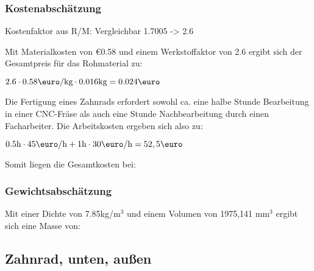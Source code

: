 \documentclass[10pt, a4paper]{article}
\begin{document}
\subsubsection{Kostenabschätzung}
\begin{center}
Kostenfaktor aus R/M: Vergleichbar 1.7005 -> 2.6 \\
\end{center}
Mit Materialkosten von \euro0.58 und einem Werkstoffaktor von 2.6 ergibt sich der Gesamtpreis für das Rohmaterial zu: 
\begin{center}
    $2.6 \cdot 0.58\text{\euro/kg} \cdot 0.016\text{kg} = 0.024\text{\euro}$
\end{center}
Die Fertigung eines Zahnrads erfordert sowohl ca. eine halbe Stunde Bearbeitung in einer CNC-Fräse als auch eine Stunde Nachbearbeitung durch einen Facharbeiter. Die Arbeitskosten ergeben sich also zu:
\begin{center}
  $0.5\text{h} \cdot 45\text{\euro/h} + 1\text{h} \cdot 30\text{\euro/h} = 52,5\text{\euro}$
\end{center}
Somit liegen die Gesamtkosten bei:
\begin{flushright}
\end{flushright}
\subsubsection{Gewichtsabschätzung}
Mit einer Dichte von 7.85kg/m$^3$ und einem Volumen von 1975,141 mm$^3$ ergibt sich eine Masse von:
\begin{flushright}
\end{flushright}

\newpage
\subsection{Zahnrad, unten, außen}
\begin{figure}[h]
  \centering
  \vspace{-10pt}
\end{figure}
\end{document}
